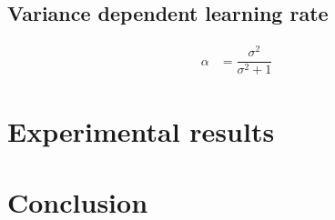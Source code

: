 \documentclass[conference]{IEEEtran}
\begin{document}
\subsection{Variance dependent learning rate}
\begin{align}
 \alpha & =\dfrac{\sigma^{2}}{\sigma^{2}+1}
\end{align}


\section{Experimental results}



\section{Conclusion}









\end{document}
